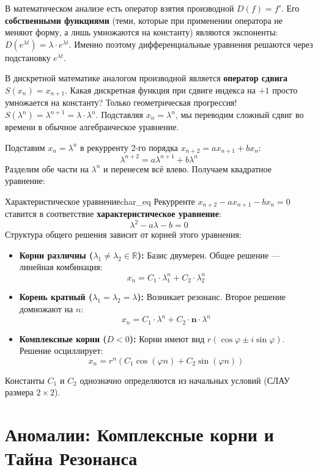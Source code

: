 \documentclass[12pt,a4paper]{article}
\begin{document}
\begin{insight}
В математическом анализе есть оператор взятия производной $D(f) = f'$. Его \textbf{собственными функциями} (теми, которые при применении оператора не меняют форму, а лишь умножаются на константу) являются экспоненты: $D(e^{\lambda t}) = \lambda \cdot e^{\lambda t}$. Именно поэтому дифференциальные уравнения решаются через подстановку $e^{\lambda t}$.

В дискретной математике аналогом производной является \textbf{оператор сдвига} $S(x_n) = x_{n+1}$. Какая дискретная функция при сдвиге индекса на $+1$ просто умножается на константу? Только геометрическая прогрессия! 
$S(\lambda^n) = \lambda^{n+1} = \lambda \cdot \lambda^n$. 
Подставляя $x_n = \lambda^n$, мы переводим сложный сдвиг во времени в обычное алгебраическое уравнение.
\end{insight}

Подставим $x_n = \lambda^n$ в рекурренту 2-го порядка $x_{n+2} = a x_{n+1} + b x_n$:
\[ \lambda^{n+2} = a \lambda^{n+1} + b \lambda^n \]
Разделим обе части на $\lambda^n$ и перенесем всё влево. Получаем квадратное уравнение:

\begin{theorem}{Характеристическое уравнение}{char_eq}
Рекурренте $x_{n+2} - a x_{n+1} - b x_n = 0$ ставится в соответствие \textbf{характеристическое уравнение}:
\[ \lambda^2 - a \lambda - b = 0 \]
Структура общего решения зависит от корней этого уравнения:
\begin{itemize}
    \item \textbf{Корни различны ($\lambda_1 \neq \lambda_2 \in \mathbb{R}$):} Базис двумерен. Общее решение — линейная комбинация:
    \[ x_n = C_1 \cdot \lambda_1^n + C_2 \cdot \lambda_2^n \]
    \item \textbf{Корень кратный ($\lambda_1 = \lambda_2 = \lambda$):} Возникает резонанс. Второе решение домножают на $n$:
    \[ x_n = C_1 \cdot \lambda^n + C_2 \cdot \mathbf{n} \cdot \lambda^n \]
    \item \textbf{Комплексные корни ($D < 0$):} Корни имеют вид $r(\cos \varphi \pm i \sin \varphi)$. Решение осциллирует:
    \[ x_n = r^n \left( C_1 \cos(\varphi n) + C_2 \sin(\varphi n) \right) \]
\end{itemize}
Константы $C_1$ и $C_2$ однозначно определяются из начальных условий (СЛАУ размера $2 \times 2$).
\end{theorem}

\newpage
\section{Аномалии: Комплексные корни и Тайна Резонанса}
\end{document}
